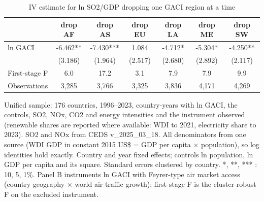 \begin{table}[htbp]\centering\small
\caption{IV estimate for ln SO2/GDP dropping one GACI region at a time}\label{tab:A3}
\begin{tabular}{lcccccc}
\toprule
 & drop AF & drop AS & drop EU & drop LA & drop ME & drop SW \\
\midrule
ln GACI & -6.462** & -7.430*** & 1.084 & -4.712* & -5.304* & -4.250** \\
 & (3.186) & (1.964) & (2.517) & (2.680) & (2.892) & (2.117) \\
First-stage F & 6.0 & 17.2 & 3.1 & 7.9 & 7.9 & 9.9 \\
\midrule
Observations & 3,285 & 3,766 & 3,325 & 3,836 & 4,171 & 4,269 \\
\bottomrule
\end{tabular}
\begin{minipage}{0.95\textwidth}\footnotesize Unified sample: 176 countries, 1996--2023, country-years with ln GACI, the controls, SO2, NOx, CO2 and energy intensities and the instrument observed (renewable shares are reported where available: WDI to 2021, electricity share to 2023). SO2 and NOx from CEDS v\_2025\_03\_18. All denominators from one source (WDI GDP in constant 2015 US\$ = GDP per capita $\times$ population), so log identities hold exactly. Country and year fixed effects; controls ln population, ln GDP per capita and its square. Standard errors clustered by country. *, **, *** : 10, 5, 1\%. Panel B instruments ln GACI with Feyrer-type air market access (country geography $\times$ world air-traffic growth); first-stage F is the cluster-robust F on the excluded instrument.\end{minipage}
\end{table}